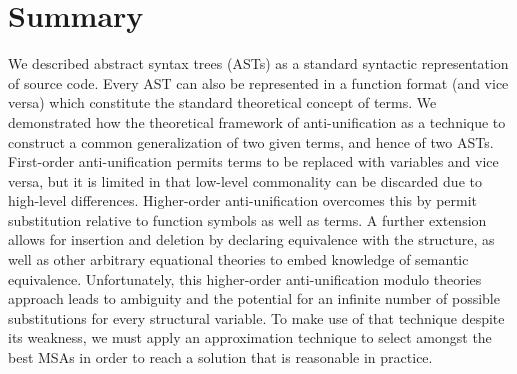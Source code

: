 \section{Summary}  \label{summary}
We described abstract syntax trees (ASTs) as a standard syntactic representation of source code.  Every AST can also be represented in a function format (and vice versa) which constitute the standard theoretical concept of terms.  We demonstrated how the theoretical framework of anti-unification as a technique to construct a common generalization of two given terms, and hence of two ASTs.  First-order anti-unification permits terms to be replaced with variables and vice versa, but it is limited in that low-level commonality can be discarded due to high-level differences.  Higher-order anti-unification overcomes this by permit substitution relative to function symbols as well as terms.  A further extension allows for insertion and deletion by declaring equivalence with the \NIL{} structure, as well as other arbitrary equational theories to embed knowledge of semantic equivalence.  Unfortunately, this higher-order anti-unification modulo theories approach leads to ambiguity and the potential for an infinite number of possible substitutions for every structural variable.  To make use of that technique despite its weakness, we must apply an approximation technique to select amongst the best MSAs in order to reach a solution that is reasonable in practice.

